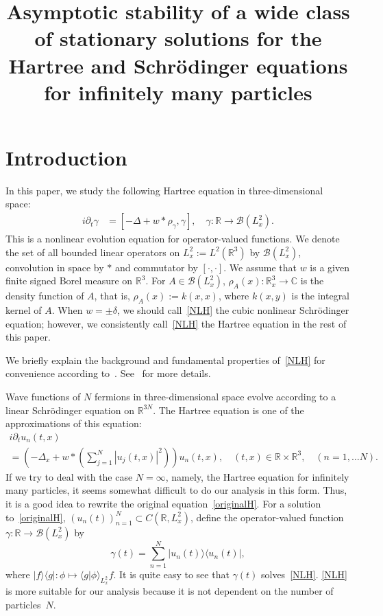 \documentclass[AHL,Unicode,longabstracts,MathTools,published]{cedram}
\title[Asymptotic stability of the Hartree equation]{Asymptotic stability of a wide class of stationary solutions for the Hartree and Schr\"odinger equations for infinitely many particles}
\author[\initial{S.} \lastname{Hadama}]{\firstname{Sonae} \lastname{Hadama}}
\newcommand{\BC}{\mathbb{C}}
\newcommand{\BR}{\mathbb{R}}
\newcommand{\CB}{\mathcal{B}}
\newcommand{\ga}{\gamma}
\newcommand{\de}{\delta}
\newcommand{\rh}{\rho}
\newcommand{\pl}{\partial}
\newcommand{\Br}[1]{\langle #1 \rangle}
\newcommand{\I}{\infty}
\begin{document}
\maketitle


\section{Introduction} 
In this paper, we study the following Hartree equation in three-dimensional space:
\begin{align}\label{NLH}
\tag{NLH} 
i \pl_t \ga &= [- \Delta + w \ast \rho_\ga, \ga], \quad \ga:\BR \to \CB(L^2_x).
\end{align}
This is a nonlinear evolution equation for operator-valued functions. We denote the set of all bounded linear operators on $L^2_x := L^2(\BR^3)$ by $\CB(L^2_x)$, convolution in space by $\ast$ and commutator by $[\cdot, \cdot]$. We assume that $w$ is a given finite signed Borel measure on $\BR^3$. For $A \in \CB(L^2_x)$, $\rh_A(x) : \BR^3_x \to \BC$ is the density function of $A$, that is, $\rh_A(x):=k(x,x)$, where $k(x,y)$ is the integral kernel of $A$. When $w = \pm \de$, we should call~\eqref{NLH} the cubic nonlinear Schr\"odinger equation; however, we consistently call~\eqref{NLH} the Hartree equation in the rest of this paper.

We briefly explain the background and fundamental properties of~\eqref{NLH} for convenience according to~\cite{2015LS}. See~\cite[Introduction]{2015LS} for more details.

Wave functions of $N$ fermions in three-dimensional space evolve according to a linear Schr\"odinger equation on $\BR^{3N}$. The Hartree equation is one of the approximations of this equation:
\begin{multline}\label{originalH}
i \pl_t u_n(t,x) \\
= \left(- \Delta_x + w \ast \left(\sum_{j=1}^N \left|u_j(t,x)\right|^2 \right) \right) u_n(t,x),
\quad (t,x) \in \BR \times \BR^3, \quad (n=1, \dots N).
\end{multline}
If we try to deal with the case $N = \I$, namely, the Hartree equation for infinitely many particles, it seems somewhat difficult to do our analysis in this form. Thus, it is a good idea to rewrite the original equation~\eqref{originalH}. For a solution to~\eqref{originalH}, $(u_n(t))_{n=1}^N \subset C(\BR, L^2_x)$, define the operator-valued function $\ga : \BR \to \CB(L^2_x)$ by
\begin{equation*}
\ga(t) = \sum_{n=1}^N |u_n(t)\rangle \langle u_n(t)|,
\end{equation*}
where $|f \rangle \langle g | : \phi \mapsto \Br{g | \phi}_{L^2_x} f$. It is quite easy to see that $\ga(t)$ solves~\eqref{NLH}. \eqref{NLH} is more suitable for our analysis because it is not dependent on the number of particles~$N$.
\end{document}
